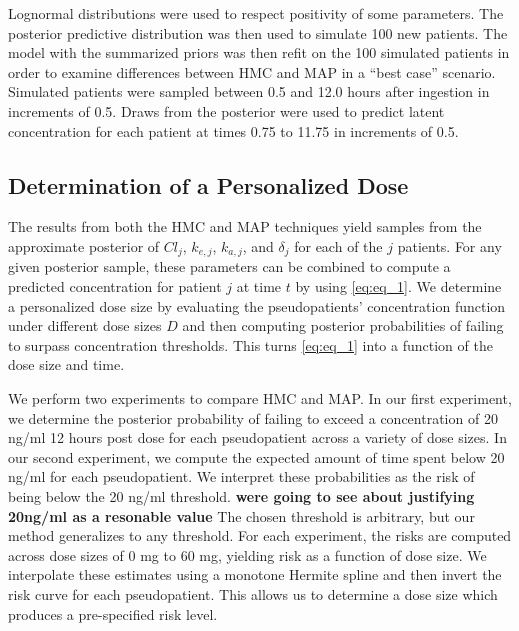 \noindent Lognormal distributions were used to respect positivity of some parameters.   The posterior predictive distribution was then used to simulate 100 new patients.  The model with the summarized priors was then refit on the 100 simulated patients in order to examine differences between HMC and MAP in a “best case” scenario. Simulated patients were sampled between 0.5 and 12.0 hours after ingestion in increments of 0.5. Draws from the posterior were used to predict latent concentration for each patient at times 0.75 to 11.75 in increments of 0.5.

\subsection*{Determination of a Personalized Dose}

The results from both the HMC and MAP techniques yield samples from the approximate posterior of $Cl_{j}$, $k_{e,j}$, $k_{a,j}$, and $\delta_j$ for each of the $j$ patients.  For any given posterior sample, these parameters can be combined to compute a predicted concentration for patient $j$ at time $t$ by using \cref{eq:eq_1}.   We determine a personalized dose size by evaluating the pseudopatients’ concentration function under different dose sizes $D$ and then computing posterior probabilities of failing to surpass concentration thresholds.  This turns \cref{eq:eq_1} into a function of the dose size and time. 


We perform two experiments to compare HMC and MAP.  In our first experiment, we determine the posterior probability of failing to exceed a concentration of 20 ng/ml 12 hours post dose for each pseudopatient across a variety of dose sizes. In our second experiment, we compute the expected amount of time spent below 20 ng/ml for each pseudopatient.  We interpret these probabilities as the risk of being below the 20 ng/ml threshold. {\bf were going to see about justifying 20ng/ml as a resonable value} The chosen threshold is arbitrary, but our method generalizes to any threshold.  For each experiment, the risks are computed across dose sizes of 0 mg to 60 mg, yielding risk as a function of dose size.  We interpolate these estimates using a monotone Hermite spline and then invert the risk curve for each pseudopatient.  This allows us to determine a dose size which produces a pre-specified risk level.
